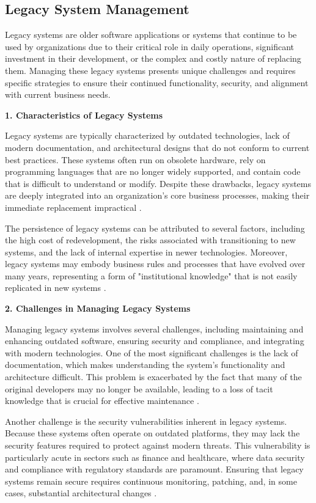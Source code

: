 \begin{refsection}
\subsection{Legacy System Management}

Legacy systems are older software applications or systems that continue to be used by organizations due to their critical role in daily operations, significant investment in their development, or the complex and costly nature of replacing them. Managing these legacy systems presents unique challenges and requires specific strategies to ensure their continued functionality, security, and alignment with current business needs.

\textbf{1. Characteristics of Legacy Systems}

Legacy systems are typically characterized by outdated technologies, lack of modern documentation, and architectural designs that do not conform to current best practices. These systems often run on obsolete hardware, rely on programming languages that are no longer widely supported, and contain code that is difficult to understand or modify. Despite these drawbacks, legacy systems are deeply integrated into an organization's core business processes, making their immediate replacement impractical \cite[pp.~209-213]{bisbal1999legacy}.

The persistence of legacy systems can be attributed to several factors, including the high cost of redevelopment, the risks associated with transitioning to new systems, and the lack of internal expertise in newer technologies. Moreover, legacy systems may embody business rules and processes that have evolved over many years, representing a form of "institutional knowledge" that is not easily replicated in new systems \cite[pp.~131-133]{bennett2002software}.

\textbf{2. Challenges in Managing Legacy Systems}

Managing legacy systems involves several challenges, including maintaining and enhancing outdated software, ensuring security and compliance, and integrating with modern technologies. One of the most significant challenges is the lack of documentation, which makes understanding the system's functionality and architecture difficult. This problem is exacerbated by the fact that many of the original developers may no longer be available, leading to a loss of tacit knowledge that is crucial for effective maintenance \cite[pp.~3-5]{chapin2001types}.

Another challenge is the security vulnerabilities inherent in legacy systems. Because these systems often operate on outdated platforms, they may lack the security features required to protect against modern threats. This vulnerability is particularly acute in sectors such as finance and healthcare, where data security and compliance with regulatory standards are paramount. Ensuring that legacy systems remain secure requires continuous monitoring, patching, and, in some cases, substantial architectural changes \cite[pp.~77-78]{brodie2001legacy}.


\end{refsection}
